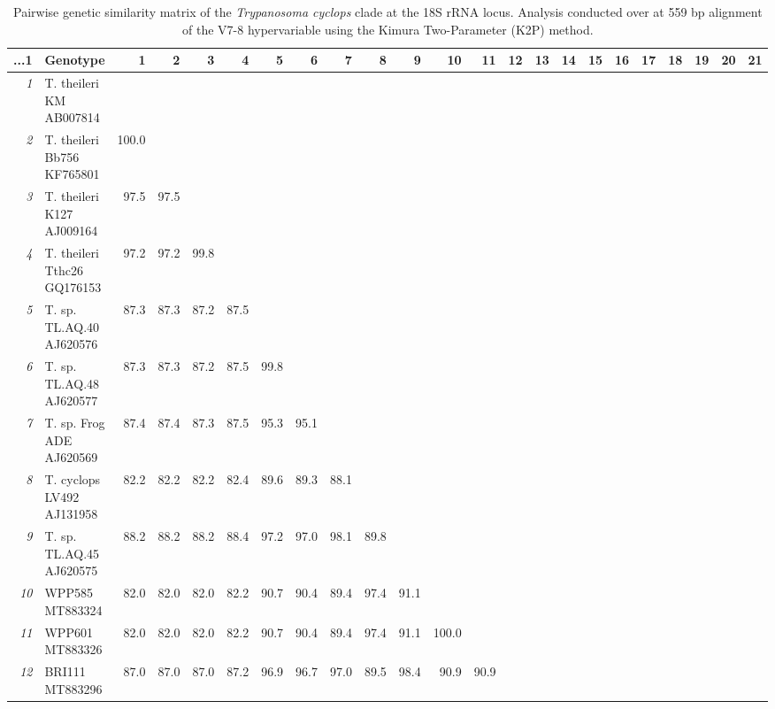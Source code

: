 \documentclass[a4paper, nobind]{templates/ociamthesis}
\begin{document}
\begin{landscape}\begingroup\fontsize{8.5}{10.5}\selectfont

\begin{longtable}[t]{>{}rlrrrrrrrrrrrrrrrrrrrrl}
\caption[Pairwise genetic similarity matrix of the \textit{Trypanosoma cyclops} clade]{\label{tab:TA62}Pairwise genetic similarity matrix of the \textit{Trypanosoma cyclops} clade at the 18S rRNA locus. Analysis conducted over at 559 bp alignment of the V7-8 hypervariable using the Kimura Two-Parameter (K2P) method.}\\
\toprule
...1 & Genotype & 1 & 2 & 3 & 4 & 5 & 6 & 7 & 8 & 9 & 10 & 11 & 12 & 13 & 14 & 15 & 16 & 17 & 18 & 19 & 20 & 21\\
\midrule
\em{1} & T. theileri KM AB007814 &  &  &  &  &  &  &  &  &  &  &  &  &  &  &  &  &  &  &  &  & \\
\em{2} & T. theileri Bb756 KF765801 & 100.0 &  &  &  &  &  &  &  &  &  &  &  &  &  &  &  &  &  &  &  & \\
\em{3} & T. theileri K127 AJ009164 & 97.5 & 97.5 &  &  &  &  &  &  &  &  &  &  &  &  &  &  &  &  &  &  & \\
\em{4} & T. theileri Tthc26 GQ176153 & 97.2 & 97.2 & 99.8 &  &  &  &  &  &  &  &  &  &  &  &  &  &  &  &  &  & \\
\em{5} & T. sp. TL.AQ.40 AJ620576 & 87.3 & 87.3 & 87.2 & 87.5 &  &  &  &  &  &  &  &  &  &  &  &  &  &  &  &  & \\
\em{6} & T. sp. TL.AQ.48 AJ620577 & 87.3 & 87.3 & 87.2 & 87.5 & 99.8 &  &  &  &  &  &  &  &  &  &  &  &  &  &  &  & \\
\em{7} & T. sp. Frog ADE AJ620569 & 87.4 & 87.4 & 87.3 & 87.5 & 95.3 & 95.1 &  &  &  &  &  &  &  &  &  &  &  &  &  &  & \\
\em{8} & T. cyclops LV492 AJ131958 & 82.2 & 82.2 & 82.2 & 82.4 & 89.6 & 89.3 & 88.1 &  &  &  &  &  &  &  &  &  &  &  &  &  & \\
\em{9} & T. sp. TL.AQ.45 AJ620575 & 88.2 & 88.2 & 88.2 & 88.4 & 97.2 & 97.0 & 98.1 & 89.8 &  &  &  &  &  &  &  &  &  &  &  &  & \\
\em{10} & WPP585 MT883324 & 82.0 & 82.0 & 82.0 & 82.2 & 90.7 & 90.4 & 89.4 & 97.4 & 91.1 &  &  &  &  &  &  &  &  &  &  &  & \\
\em{11} & WPP601 MT883326 & 82.0 & 82.0 & 82.0 & 82.2 & 90.7 & 90.4 & 89.4 & 97.4 & 91.1 & 100.0 &  &  &  &  &  &  &  &  &  &  & \\
\em{12} & BRI111 MT883296 & 87.0 & 87.0 & 87.0 & 87.2 & 96.9 & 96.7 & 97.0 & 89.5 & 98.4 & 90.9 & 90.9 &  &  &  &  &  &  &  &  &  & \\

\end{longtable}
\end{landscape}
\end{document}
